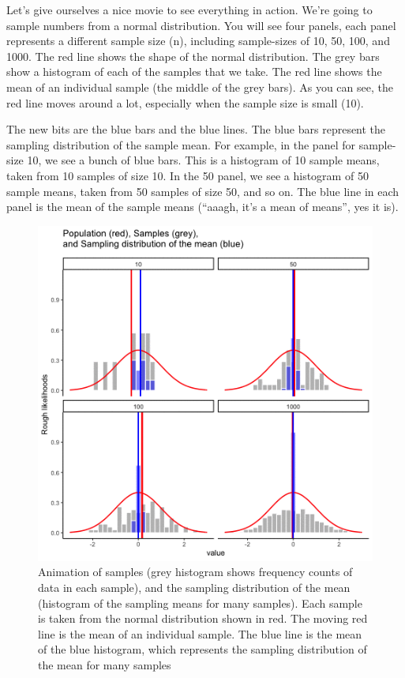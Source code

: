 \documentclass[]{book}
\begin{document}
Let's give ourselves a nice movie to see everything in action. We're going to sample numbers from a normal distribution. You will see four panels, each panel represents a different sample size (n), including sample-sizes of 10, 50, 100, and 1000. The red line shows the shape of the normal distribution. The grey bars show a histogram of each of the samples that we take. The red line shows the mean of an individual sample (the middle of the grey bars). As you can see, the red line moves around a lot, especially when the sample size is small (10).

The new bits are the blue bars and the blue lines. The blue bars represent the sampling distribution of the sample mean. For example, in the panel for sample-size 10, we see a bunch of blue bars. This is a histogram of 10 sample means, taken from 10 samples of size 10. In the 50 panel, we see a histogram of 50 sample means, taken from 50 samples of size 50, and so on. The blue line in each panel is the mean of the sample means (``aaagh, it's a mean of means'', yes it is).

\begin{figure}
\centering
\includegraphics{gifs/sampleDistNormal-1.gif}
\caption{\label{fig:4samplingmean}Animation of samples (grey histogram shows frequency counts of data in each sample), and the sampling distribution of the mean (histogram of the sampling means for many samples). Each sample is taken from the normal distribution shown in red. The moving red line is the mean of an individual sample. The blue line is the mean of the blue histogram, which represents the sampling distribution of the mean for many samples}
\end{figure}
\end{document}
